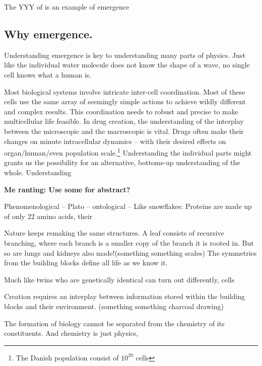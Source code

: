 The YYY of is an example of emergence
\subsection{Why emergence. }

Understanding emergence is key to understanding many parts of physics. Just like the individual water molecule does not know the shape of a wave, no single cell knows what a human is. 


Most biological systems involve intricate inter-cell coordination. Most of these cells use the same array of seemingly simple actions to achieve wildly different and complex results. This coordination needs to robust and precise to make multicellular life feasible. In drug creation, the understanding of the interplay between the microscopic and the macroscopic is vital. Drugs often make their changes on minute intracellular dynamics -- with their desired effects on organ/human/even population scale.\footnote{The Danish population consist of $10^{20}$ cells}
Understanding the individual parts might grants us the possibility for an alternative, bottoms-up understanding of the whole. Understanding  


\textbf{Me ranting: Use some for abstract?}

Phenomenological -- Plato -- ontological --
Like snowflakes:
Proteins are made up of only 22 amino acids, their 

Nature keeps remaking the same structures. A leaf consists of recursive branching, where each branch is a smaller copy of the branch it is rooted in. But so are lungs and kidneys also made!(something something scales)  The symmetries from the building blocks define all life as we know it. 

Much like twins who are genetically identical can turn out differently, cells

Creation requires an interplay between information stored within the building blocks and their environment. (something something charcoal drawing)

The formation of biology cannot be separated from the chemistry of its constituents. And chemistry is just physics, 

